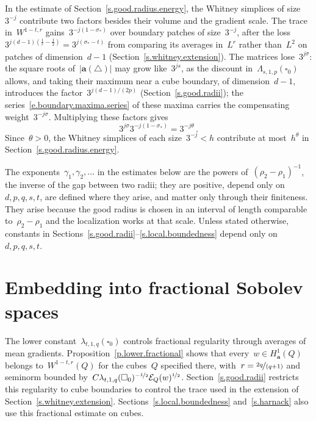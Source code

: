 \documentclass[11pt,letterpaper]{article}
\numberwithin{equation}{section}
\theoremstyle{definition}
\renewcommand{\a}{\mathbf{a}}
\newcommand{\nf}{\nicefrac}
\newcommand{\cu}{\square}
\newcommand{\Ener}{\mathcal E}
\begin{document}
In the estimate of Section~\ref{s.good.radius.energy}, the Whitney simplices of size~$3^{-j}$ contribute two factors besides their volume and the gradient scale. The trace in~$W^{1-t,r}$ gains~$3^{-j(1-\sigma_*)}$ over boundary patches of size~$3^{-j}$, after the loss~$3^{j(d-1)(\frac1r-\frac12)}=3^{j(\sigma_*-t)}$ from comparing its averages in~$L^r$ rather than~$L^2$ on patches of dimension~$d-1$ (Section~\ref{s.whitney.extension}). The matrices lose~$3^{j\sigma}$: the square roots of~$|\a(\triangle)|$ may grow like~$3^{js}$, as the discount in~$\Lambda_{s,1,p}(\cu_0)$ allows, and taking their maximum near a cube boundary, of dimension~$d-1$, introduces the factor~$3^{j(d-1)/(2p)}$ (Section~\ref{s.good.radii}); the series~\eqref{e.boundary.maxima.series} of these maxima carries the compensating weight~$3^{-j\sigma}$. Multiplying these factors gives
\begin{equation*}
	3^{j\sigma}3^{-j(1-\sigma_*)}=3^{-j\theta}\,.
\end{equation*}
Since~$\theta>0$, the Whitney simplices of each size~$3^{-j}<h$ contribute at most~$h^\theta$ in Section~\ref{s.good.radius.energy}.

\smallskip

The exponents~$\gamma_1,\gamma_2,\ldots$ in the estimates below are the powers of~$(\rho_2-\rho_1)^{-1}$, the inverse of the gap between two radii; they are positive, depend only on~$d,p,q,s,t$, are defined where they arise, and matter only through their finiteness. They arise because the good radius is chosen in an interval of length comparable to~$\rho_2-\rho_1$ and the localization works at that scale. Unless stated otherwise, constants in Sections~\ref{s.good.radii}--\ref{s.local.boundedness} depend only on~$d,p,q,s,t$.

\section{Embedding into fractional Sobolev spaces}
\label{s.fractional.reconstruction}

The lower constant~$\lambda_{t,1,q}(\cu_0)$ controls fractional regularity through averages of mean gradients. Proposition~\ref{p.lower.fractional} shows that every~$w\in H^1_\a(Q)$ belongs to~$W^{1-t,r}(Q)$ for the cubes~$Q$ specified there, with~$r=\nf{2q}{(q+1)}$ and seminorm bounded by~$C\lambda_{t,1,q}(\cu_0)^{-\nf12}\Ener_Q(w)^{\nf12}$. Section~\ref{s.good.radii} restricts this regularity to cube boundaries to control the trace used in the extension of Section~\ref{s.whitney.extension}. Sections~\ref{s.local.boundedness} and~\ref{s.harnack} also use this fractional estimate on cubes.
\end{document}
